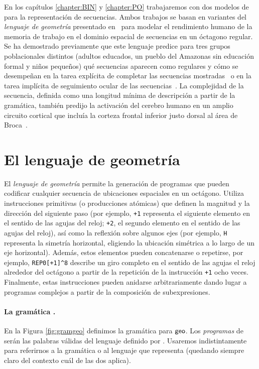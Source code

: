 
En los capítulos \ref{chapter:BIN} y \ref{chapter:PO} trabajaremos con dos modelos de \lot para la representación de secuencias. Ambos trabajos se basan en variantes del \textit{lenguaje de geometría} presentado en~\cite{amalric2017language} para modelar el rendimiento humano de la memoria de trabajo en el dominio espacial de secuencias en un óctagono regular. Se ha demostrado previamente que este lenguaje predice para tres grupos poblacionales distintos (adultos educados, un pueblo del Amazonas sin educación formal y niños pequeños) qué secuencias aparecen como regulares y cómo se desempeñan en la tarea explícita de completar las secuencias mostradas~\cite{amalric2017language} o en la tarea implícita de seguimiento ocular de las secuencias~\cite{f60}. La complejidad de la secuencia, definida como una longitud mínima de descripción a partir de la gramática, también predijo la activación del cerebro humano en un amplio circuito cortical que incluía la corteza frontal inferior justo dorsal al área de Broca~\cite{f60}.

\section*{El lenguaje de geometría \gramgeo}

El \textit{lenguaje de geometría} permite la generación de programas que pueden codificar cualquier secuencia de ubicaciones espaciales en un octágono. Utiliza instrucciones primitivas (o producciones atómicas) que definen la magnitud y la dirección del siguiente paso (por ejemplo, \verb#+1# representa el siguiente elemento en el sentido de las agujas del reloj; \verb#+2#, el segundo elemento en el sentido de las agujas del reloj), así como la reflexión sobre algunos ejes (por ejemplo, \verb#H# representa la simetría horizontal, eligiendo la ubicación simétrica a lo largo de un eje horizontal). Además, estos elementos pueden concatenarse o repetirse, por ejemplo, \verb#REP0[+1]^8# describe un giro completo en el sentido de las agujas el reloj alrededor del octágono a partir de la repetición de la instrucción \verb#+1# ocho veces. Finalmente, estas instrucciones pueden anidarse arbitrariamente dando lugar a programas complejos a partir de la composición de subexpresiones.

\paragraph{La gramática \gramgeo.}
En la Figura \ref{fig:gramgeo} definimos la gramática para ${\sf geo}$. Los {\em programas} de \gramgeo serán las palabras válidas del lenguaje definido por \gramgeo. Usaremos indistintamente \gramgeo para referirnos a la gramática o al lenguaje que representa (quedando siempre claro del contexto cuál de las dos aplica).


